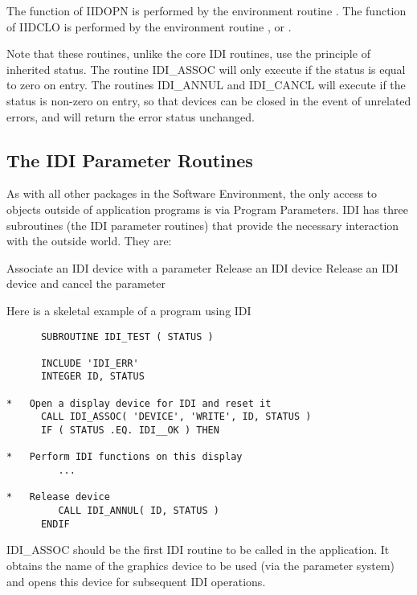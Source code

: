 The function of IIDOPN is performed by the environment routine 
.
The function of IIDCLO is performed by the environment routine 
,
or .

Note that these routines, unlike the core IDI routines, use the principle
of inherited status. The routine IDI\_ASSOC will only execute if the
status is equal to zero on entry. The routines IDI\_ANNUL and IDI\_CANCL
will execute if the status is non-zero on entry, so that devices can be
closed in the event of unrelated errors, and will return the error
status unchanged.

\subsection{The IDI Parameter Routines}

As with all other packages in the Software Environment, the only access to
objects outside of application programs is via Program Parameters. IDI has
three subroutines (the IDI parameter routines) that provide the
necessary interaction with the outside world. They are:

\begin{routinelist}
{Associate an IDI device with a parameter}
{Release an IDI device}
{Release an IDI device and cancel the parameter}
\end{routinelist}

Here is a skeletal example of a program using IDI
\begin{small}
\begin{verbatim}
      SUBROUTINE IDI_TEST ( STATUS )

      INCLUDE 'IDI_ERR'
      INTEGER ID, STATUS

*   Open a display device for IDI and reset it
      CALL IDI_ASSOC( 'DEVICE', 'WRITE', ID, STATUS )
      IF ( STATUS .EQ. IDI__OK ) THEN

*   Perform IDI functions on this display
         ...

*   Release device
         CALL IDI_ANNUL( ID, STATUS )
      ENDIF
\end{verbatim}
\end{small}

IDI\_ASSOC should be the first IDI routine to be called in the application.
It obtains the name of the graphics device to be used (via the parameter
system) and opens this device for subsequent IDI operations.

